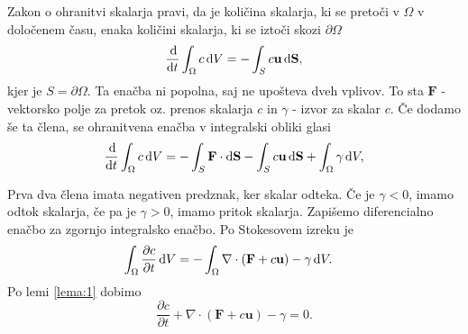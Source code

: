 \documentclass[mat2, tisk]{fmfdelo}
\newcommand{\bd}{\textbf}
\begin{document}
Zakon o ohranitvi skalarja pravi, da je količina skalarja, ki se pretoči v $\Omega$ v določenem času, 
enaka količini skalarja, ki se iztoči skozi $\partial\Omega$
\begin{equation*}
\frac{\dif}{\dif t} \int_{\Omega} c \dif V =  - \int_S c \bd{u} \dif \bd{S},
\end{equation*}
kjer je $S = \partial \Omega$. Ta enačba ni popolna, saj ne upošteva dveh vplivov.
To sta $\bd{F}$ - vektorsko polje za pretok oz. prenos skalarja $c$ in $\gamma$ - izvor za skalar $c$.
Če dodamo še ta člena, se ohranitvena enačba v integralski obliki glasi
\begin{equation*}
  \frac{\dif}{\dif t} \int_{\Omega} c \dif V = - \int_S \bd{F} \cdot \dif \bd{S} - 
  \int_S c \bd{u}  \dif \bd{S} + \int_\Omega \gamma \dif V,
\end{equation*}    

Prva dva člena imata negativen predznak, ker skalar odteka. Če je $\gamma < 0$, imamo odtok skalarja, če pa je $\gamma > 0$, imamo pritok skalarja. 
Zapišemo diferencialno enačbo za zgornjo integralsko enačbo. Po Stokesovem izreku je
\begin{align*}
\int_{\Omega} \frac{\partial c}{\partial t} \dif V &= - \int_\Omega \nabla\cdot(\bd{F} + c \bd{u}) - \gamma \dif V .
\end{align*}
Po lemi \ref{lema:1} dobimo
\begin{equation*}
\frac{\partial c}{\partial t} + \nabla \cdot (\bd{F} + c\bd{u}) - \gamma = 0.
\end{equation*}
\end{document}
